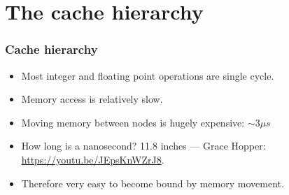 \documentclass{beamer}
\begin{document}
\section{The cache hierarchy}
\begin{frame}
\frametitle{Cache hierarchy}
\begin{center}
\begin{adjustbox}{max width={.8\textwidth}}
\end{adjustbox}
\end{center}

\begin{itemize}
  \item Most integer and floating point operations are single cycle.
  \item Memory access is relatively slow.
  \item Moving memory between nodes is hugely expensive: $\sim 3\mu s$
  \item How long is a nanosecond? 11.8 inches --- Grace Hopper: \url{https://youtu.be/JEpsKnWZrJ8}.
  \item Therefore very easy to become bound by memory movement.

\end{itemize}
\end{frame}
\end{document}
